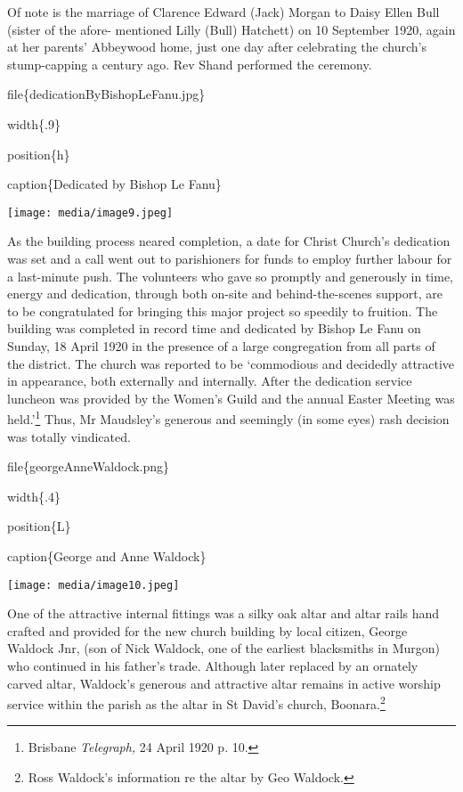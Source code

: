 Of note is the marriage of Clarence Edward (Jack) Morgan to Daisy Ellen
Bull (sister of the afore- mentioned Lilly (Bull) Hatchett) on 10
September 1920, again at her parents' Abbeywood home, just one day after
celebrating the church's stump-capping a century ago. Rev Shand
performed the ceremony.

file\{dedicationByBishopLeFanu.jpg\}

width\{.9\}

position\{h\}

caption\{Dedicated by Bishop Le Fanu\}

\texttt{[image: media/image9.jpeg]}

As the building process neared completion, a date for Christ Church's
dedication was set and a call went out to parishioners for funds to
employ further labour for a last-minute push. The volunteers who gave so
promptly and generously in time, energy and dedication, through both
on-site and behind-the-scenes support, are to be congratulated for
bringing this major project so speedily to fruition. The building was
completed in record time and dedicated by Bishop Le Fanu on Sunday, 18
April 1920 in the presence of a large congregation from all parts of the
district. The church was reported to be `commodious and decidedly
attractive in appearance, both externally and internally. After the
dedication service luncheon was provided by the Women's Guild and the
annual Easter Meeting was held.'\footnote{Brisbane \emph{Telegraph,} 24
  April 1920 p. 10.} Thus, Mr Maudsley's generous and seemingly (in some
eyes) rash decision was totally vindicated.

file\{georgeAnneWaldock.png\}

width\{.4\}

position\{L\}

caption\{George and Anne Waldock\}

\texttt{[image: media/image10.jpeg]}

One of the attractive internal fittings was a silky oak altar and altar
rails hand crafted and provided for the new church building by local
citizen, George Waldock Jnr, (son of Nick Waldock, one of the earliest
blacksmiths in Murgon) who continued in his father's trade. Although
later replaced by an ornately carved altar, Waldock's generous and
attractive altar remains in active worship service within the parish as
the altar in St David's church, Boonara.\footnote{Ross Waldock's
  information re the altar by Geo Waldock.}

